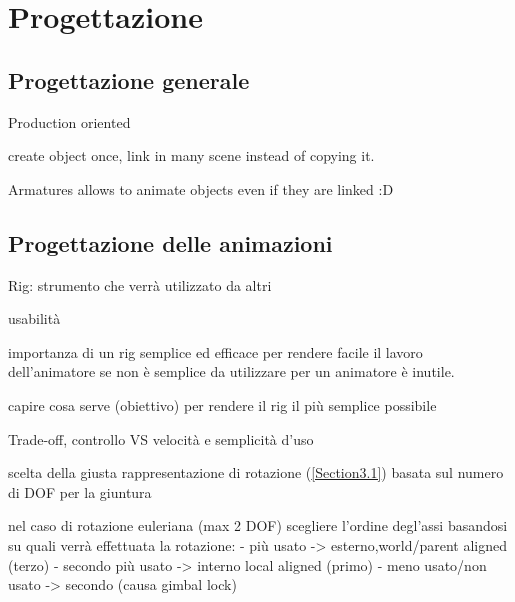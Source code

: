 
\chapter{Progettazione} %

\label{Chapter4} %


\section{Progettazione generale}

Production oriented

create object once, link in many scene instead of copying it.

Armatures allows to animate objects even if they are linked :D

\section{Progettazione delle animazioni}

Rig: strumento che verrà utilizzato da altri

usabilità

importanza di un rig semplice ed efficace per rendere facile il lavoro dell'animatore
se non è semplice da utilizzare per un animatore è inutile.

capire cosa serve (obiettivo) per rendere il rig il più semplice possibile

Trade-off, controllo VS velocità e semplicità d'uso

scelta della giusta rappresentazione di rotazione (\ref{Section3.1}) basata sul numero di DOF per la giuntura

nel caso di rotazione euleriana (max 2 DOF) scegliere l'ordine degl'assi basandosi su quali verrà effettuata la rotazione:
- più usato -> esterno,world/parent aligned (terzo)
- secondo più usato -> interno local aligned (primo)
- meno usato/non usato -> secondo (causa gimbal lock)
